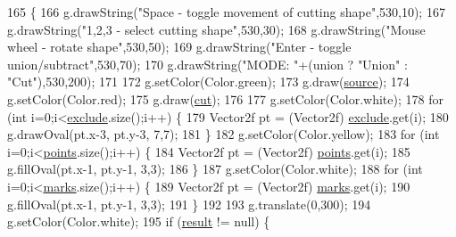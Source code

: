 \begin{DoxyCode}
165                                   \{
166         g.drawString(\textcolor{stringliteral}{"Space - toggle movement of cutting shape"},530,10);
167         g.drawString(\textcolor{stringliteral}{"1,2,3 - select cutting shape"},530,30);
168         g.drawString(\textcolor{stringliteral}{"Mouse wheel - rotate shape"},530,50);
169         g.drawString(\textcolor{stringliteral}{"Enter - toggle union/subtract"},530,70);
170         g.drawString(\textcolor{stringliteral}{"MODE: "}+(\textcolor{keyword}{union} ? \textcolor{stringliteral}{"Union"} : \textcolor{stringliteral}{"Cut"}),530,200);
171         
172         g.setColor(Color.green);
173         g.draw(\mbox{\hyperlink{classorg_1_1newdawn_1_1slick_1_1tests_1_1_geom_util_test_a608f7ccfa180e1e71c5939b8ef38c1fa}{source}});
174         g.setColor(Color.red);
175         g.draw(\mbox{\hyperlink{classorg_1_1newdawn_1_1slick_1_1tests_1_1_geom_util_test_abb232621689f77335ad9a620f991adf8}{cut}});
176 
177         g.setColor(Color.white);
178         \textcolor{keywordflow}{for} (\textcolor{keywordtype}{int} i=0;i<\mbox{\hyperlink{classorg_1_1newdawn_1_1slick_1_1tests_1_1_geom_util_test_ae81ed2cbfad947c569f76bdf2ec73da7}{exclude}}.size();i++) \{
179             Vector2f pt = (Vector2f) \mbox{\hyperlink{classorg_1_1newdawn_1_1slick_1_1tests_1_1_geom_util_test_ae81ed2cbfad947c569f76bdf2ec73da7}{exclude}}.get(i);
180             g.drawOval(pt.x-3, pt.y-3, 7,7);
181         \}
182         g.setColor(Color.yellow);
183         \textcolor{keywordflow}{for} (\textcolor{keywordtype}{int} i=0;i<\mbox{\hyperlink{classorg_1_1newdawn_1_1slick_1_1tests_1_1_geom_util_test_ac17af1067ad6fc4f5e0d55ba2e6435d5}{points}}.size();i++) \{
184             Vector2f pt = (Vector2f) \mbox{\hyperlink{classorg_1_1newdawn_1_1slick_1_1tests_1_1_geom_util_test_ac17af1067ad6fc4f5e0d55ba2e6435d5}{points}}.get(i);
185             g.fillOval(pt.x-1, pt.y-1, 3,3);
186         \}
187         g.setColor(Color.white);
188         \textcolor{keywordflow}{for} (\textcolor{keywordtype}{int} i=0;i<\mbox{\hyperlink{classorg_1_1newdawn_1_1slick_1_1tests_1_1_geom_util_test_a316d1f8e9dcf90bc91c007a42184cd37}{marks}}.size();i++) \{
189             Vector2f pt = (Vector2f) \mbox{\hyperlink{classorg_1_1newdawn_1_1slick_1_1tests_1_1_geom_util_test_a316d1f8e9dcf90bc91c007a42184cd37}{marks}}.get(i);
190             g.fillOval(pt.x-1, pt.y-1, 3,3);
191         \}
192         
193         g.translate(0,300);
194         g.setColor(Color.white);
195         \textcolor{keywordflow}{if} (\mbox{\hyperlink{classorg_1_1newdawn_1_1slick_1_1tests_1_1_geom_util_test_af4ae92e561e02a091075109486da4a61}{result}} != null) \{

\end{DoxyCode}
